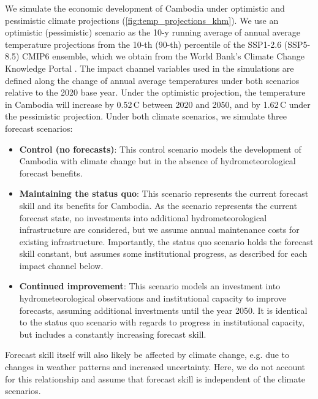 \documentclass[
  final,
  10pt,
  letterpaper,
  english,
]{article}
\begin{document}
We simulate the economic development of Cambodia under optimistic and
pessimistic climate projections (\cref{fig:temp_projections_khm}). We use an
optimistic (pessimistic) scenario as the 10-y running average of annual average
temperature projections from the 10-th (90-th) percentile of the SSP1-2.6
(SSP5-8.5) CMIP6 ensemble, which we obtain from the World Bank's Climate Change
Knowledge Portal \parencite{worldbank2025climate_temp_cambodia}. The impact
channel variables used in the simulations are defined along the change of annual
average temperatures under both scenarios relative to the 2020 base year. Under
the optimistic projection, the temperature in Cambodia will increase by
0.52\degree\,C between 2020 and 2050, and by 1.62\degree\,C under the pessimistic
projection. Under both climate scenarios, we simulate three forecast scenarios:
\begin{itemize}
  \item \textbf{Control (no forecasts)}: This control scenario models the
    development of Cambodia with climate change but in the absence of
    hydrometeorological forecast benefits.
  \item \textbf{Maintaining the status quo}: This scenario represents the
    current forecast skill and its benefits for Cambodia. As the scenario
    represents the current forecast state, no investments into additional
    hydrometeorological infrastructure are considered, but we assume annual
    maintenance costs for existing infrastructure. Importantly, the status quo 
    scenario holds the forecast skill constant, but assumes some institutional 
    progress, as described for each impact channel below. 
  \item \textbf{Continued improvement}: This scenario models an investment into
  hydrometeorological observations and institutional capacity to improve
  forecasts, assuming additional investments until the year 2050. It is identical
  to the status quo scenario with regards to progress in institutional capacity, 
  but includes a constantly increasing forecast skill. 
\end{itemize}
Forecast skill itself will also likely be affected by climate change, e.g. due
to changes in weather patterns and increased uncertainty. Here, we do not
account for this relationship and assume that forecast skill is independent of
the climate scenarios.
 
\end{document}
